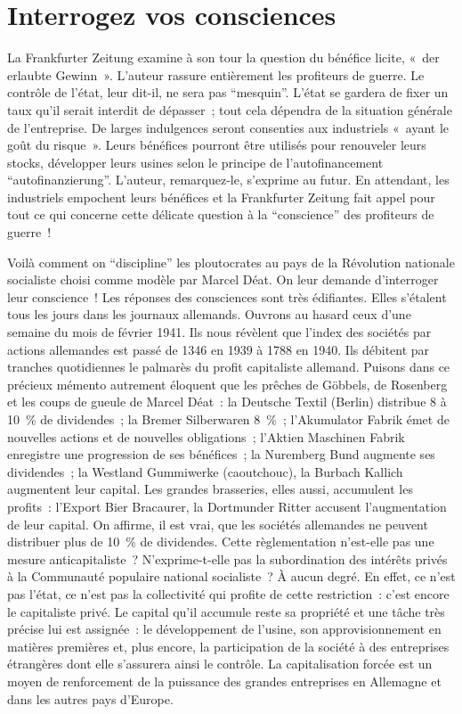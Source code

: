 \documentclass[french,twoside]{book} %
\begin{document}
\section[{Interrogez vos consciences}]{Interrogez vos consciences}
\noindent La Frankfurter Zeitung examine à son tour la question du bénéfice licite, « der erlaubte Gewinn ». L’auteur rassure entièrement les profiteurs de guerre. Le contrôle de l’état, leur dit-il, ne sera pas “mesquin”. L’état se gardera de fixer un taux qu’il serait interdit de dépasser ; tout cela dépendra de la situation générale de l’entreprise. De larges indulgences seront consenties aux industriels « ayant le goût du risque ». Leurs bénéfices pourront être utilisés pour renouveler leurs stocks, développer leurs usines selon le principe de l’autofinancement “autofinanzierung”. L’auteur, remarquez-le, s’exprime au futur. En attendant, les industriels empochent leurs bénéfices et la Frankfurter Zeitung fait appel pour tout ce qui concerne cette délicate question à la “conscience” des profiteurs de guerre !\par
Voilà comment on “discipline” les ploutocrates au pays de la Révolution nationale socialiste choisi comme modèle par Marcel Déat. On leur demande d’interroger leur conscience ! Les réponses des consciences sont très édifiantes. Elles s’étalent tous les jours dans les journaux allemands. Ouvrons au hasard ceux d’une semaine du mois de février 1941. Ils nous révèlent que l’index des sociétés par actions allemandes est passé de 1346 en 1939 à 1788 en 1940. Ils débitent par tranches quotidiennes le palmarès du profit capitaliste allemand. Puisons dans ce précieux mémento autrement éloquent que les prêches de Göbbels, de Rosenberg et les coups de gueule de Marcel Déat : la Deutsche Textil (Berlin) distribue 8 à 10 \% de dividendes ; la Bremer Silberwaren 8 \% ; l’Akumulator Fabrik émet de nouvelles actions et de nouvelles obligations ; l’Aktien Maschinen Fabrik enregistre une progression de ses bénéfices ; la Nuremberg Bund augmente ses dividendes ; la Westland Gummiwerke (caoutchouc), la Burbach Kallich augmentent leur capital. Les grandes brasseries, elles aussi, accumulent les profits : l’Export Bier Bracaurer, la Dortmunder Ritter accusent l’augmentation de leur capital. On affirme, il est vrai, que les sociétés allemandes ne peuvent distribuer plus de 10 \% de dividendes. Cette règlementation n’est-elle pas une mesure anticapitaliste ? N’exprime-t-elle pas la subordination des intérêts privés à la Communauté populaire national socialiste ? À aucun degré. En effet, ce n’est pas l’état, ce n’est pas la collectivité qui profite de cette restriction : c’est encore le capitaliste privé. Le capital qu’il accumule reste sa propriété et une tâche très précise lui est assignée : le développement de l’usine, son approvisionnement en matières premières et, plus encore, la participation de la société à des entreprises étrangères dont elle s’assurera ainsi le contrôle. La capitalisation forcée est un moyen de renforcement de la puissance des grandes entreprises en Allemagne et dans les autres pays d’Europe.
\end{document}
